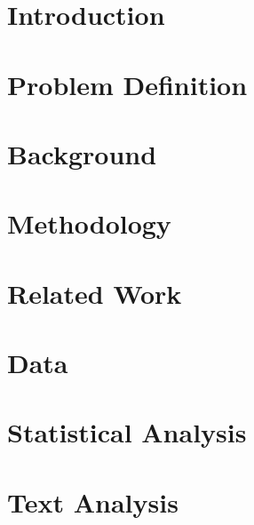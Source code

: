 \begin{abstract} 
    
\end{abstract}

\clearpage

\begin{abstract} 
    
\end{abstract}

\tableofcontents 
\cleardoublepage %

\section{Introduction}
\label{section:introduction}


\section{Problem Definition}
\label{section:problem_definition}


\section{Background}
\label{section:background}


\section{Methodology}
\label{section:methodology}


\section{Related Work}
\label{section:related_work}


\section{Data}
\label{section:data}


\section{Statistical Analysis}
\label{section:statistical_analysis}


\section{Text Analysis}
\label{section:text_analysis}


